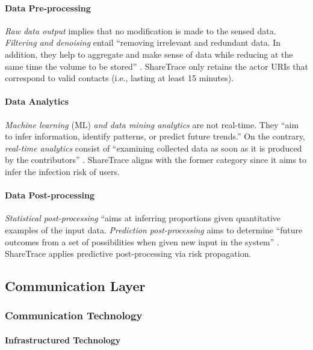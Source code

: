 \paragraph{Data Pre-processing}

\emph{Raw data output} implies that no modification is made to the sensed data. \emph{Filtering and denoising} entail ``removing irrelevant and redundant data. In addition, they help to aggregate and make sense of data while reducing at the same time the volume to be stored'' \cite{Capponi2019}. ShareTrace only retains the actor URIs that correspond to valid contacts (i.e., lasting at least 15 minutes).

\paragraph{Data Analytics}

\emph{Machine learning} (ML) \emph{and data mining analytics} are not real-time. They ``aim to infer information, identify patterns, or predict future trends.'' On the contrary, \emph{real-time analytics} consist of ``examining collected data as soon as it is produced by the contributors'' \cite{Capponi2019}. ShareTrace aligns with the former category since it aims to infer the infection risk of users.

\paragraph{Data Post-processing}

\emph{Statistical post-processing} ``aims at inferring proportions given quantitative examples of the input data. \emph{Prediction post-processing} aims to determine ``future outcomes from a set of possibilities when given new input in the system'' \cite{Capponi2019}. ShareTrace applies predictive post-processing via risk propagation.

\subsection{Communication Layer}

\subsubsection{Communication Technology}

\paragraph{Infrastructured Technology}

